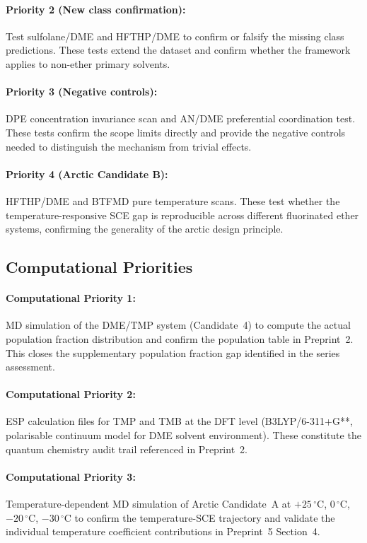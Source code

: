 \documentclass[11pt]{article}
\theoremstyle{plain}
\theoremstyle{definition}
\theoremstyle{remark}
\begin{document}
\paragraph{Priority 2 (New class confirmation):}
Test sulfolane/DME and HFTHP/DME to confirm or falsify
the missing class predictions.  These tests extend the
dataset and confirm whether the framework applies to
non-ether primary solvents.

\paragraph{Priority 3 (Negative controls):}
DPE concentration invariance scan and AN/DME preferential
coordination test.  These tests confirm the scope limits
directly and provide the negative controls needed to
distinguish the mechanism from trivial effects.

\paragraph{Priority 4 (Arctic Candidate B):}
HFTHP/DME and BTFMD pure temperature scans.  These test
whether the temperature-responsive SCE gap is reproducible
across different fluorinated ether systems, confirming the
generality of the arctic design principle.

\subsection{Computational Priorities}

\paragraph{Computational Priority 1:}
MD simulation of the DME/TMP system (Candidate~4) to
compute the actual population fraction distribution and
confirm the population table in Preprint~2.  This closes
the supplementary population fraction gap identified in
the series assessment.

\paragraph{Computational Priority 2:}
ESP calculation files for TMP and TMB at the DFT level
(B3LYP/6-311+G**, polarisable continuum model for DME
solvent environment).  These constitute the quantum chemistry
audit trail referenced in Preprint~2.

\paragraph{Computational Priority 3:}
Temperature-dependent MD simulation of Arctic Candidate~A
at $+25\,^\circ$C, $0\,^\circ$C, $-20\,^\circ$C,
$-30\,^\circ$C to confirm the temperature-SCE trajectory
and validate the individual temperature coefficient
contributions in Preprint~5 Section~4.
\end{document}
